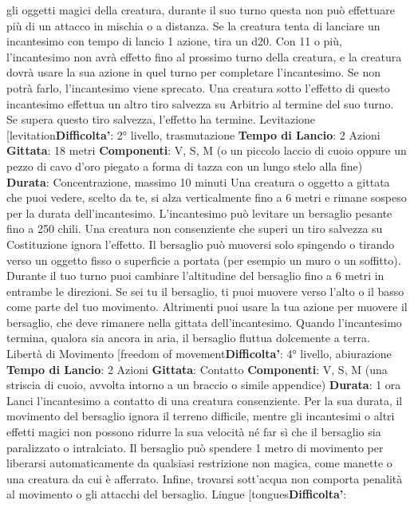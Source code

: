 \begin{multicols}{2}
gli oggetti magici della creatura, durante il suo turno
questa non può effettuare più di un attacco in mischia o
a distanza.
Se la creatura tenta di lanciare un incantesimo con
tempo di lancio 1 azione, tira un d20. Con 11 o più,
l’incantesimo non avrà effetto fino al prossimo turno
della creatura, e la creatura dovrà usare la sua azione
in quel turno per completare l’incantesimo. Se non potrà
farlo, l’incantesimo viene sprecato.
Una creatura sotto l’effetto di questo incantesimo
effettua un altro tiro salvezza su Arbitrio al termine
del suo turno. Se supera questo tiro salvezza, l’effetto
ha termine.
Levitazione
[levitation\textbf{Difficolta'}:
2° livello, trasmutazione
\textbf{Tempo di Lancio}: 2 Azioni
\textbf{Gittata}: 18 metri
\textbf{Componenti}: V, S, M (o un piccolo laccio di cuoio
oppure un pezzo di cavo d’oro piegato a forma di tazza
con un lungo stelo alla fine)
\textbf{Durata}: Concentrazione, massimo 10 minuti
Una creatura o oggetto a gittata che puoi vedere, scelto
da te, si alza verticalmente fino a 6 metri e rimane
sospeso per la durata dell’incantesimo. L’incantesimo
può levitare un bersaglio pesante fino a 250 chili. Una
creatura non consenziente che superi un tiro salvezza
su Costituzione ignora l’effetto.
Il bersaglio può muoversi solo spingendo o tirando
verso un oggetto fisso o superficie a portata (per
esempio un muro o un soffitto). Durante il tuo turno puoi
cambiare l’altitudine del bersaglio fino a 6 metri in
entrambe le direzioni. Se sei tu il bersaglio, ti puoi
muovere verso l’alto o il basso come parte del tuo
movimento. Altrimenti puoi usare la tua azione per
muovere il bersaglio, che deve rimanere nella gittata
dell’incantesimo.
Quando l’incantesimo termina, qualora sia ancora in
aria, il bersaglio fluttua dolcemente a terra.
Libertà di Movimento
[freedom of movement\textbf{Difficolta'}:
4° livello, abiurazione
\textbf{Tempo di Lancio}: 2 Azioni
\textbf{Gittata}: Contatto
\textbf{Componenti}: V, S, M (una striscia di cuoio, avvolta
intorno a un braccio o simile appendice)
\textbf{Durata}: 1 ora
Lanci l’incantesimo a contatto di una creatura
consenziente. Per la sua durata, il movimento del
bersaglio ignora il terreno difficile, mentre gli
incantesimi o altri effetti magici non possono ridurre la
sua velocità né far sì che il bersaglio sia paralizzato o
intralciato.
Il bersaglio può spendere 1 metro di movimento per
liberarsi automaticamente da qualsiasi restrizione non
magica, come manette o una creatura da cui è
afferrato. Infine, trovarsi sott’acqua non comporta
penalità al movimento o gli attacchi del bersaglio.
Lingue
[tongues\textbf{Difficolta'}:

\end{multicols}

